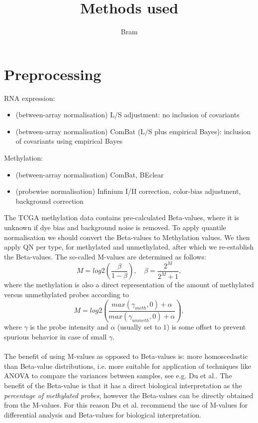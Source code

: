 \documentclass[a4paper,10pt]{article}
\title{Methods used}
\author{Bram}
\begin{document}
\section{Preprocessing}
%




RNA expression:
\begin{itemize}
 \item (between-array normalisation) L/S adjustment: no inclusion of covariants
 \item (between-array normalisation) ComBat (L/S plus empirical Bayes): inclusion of covariants using empirical Bayes
\end{itemize}
%
Methylation:
\begin{itemize}
 \item (between-array normalisation) ComBat, BEclear
 \item (probewise normalisation) Infinium I/II correction, color-bias adjustment, background correction
\end{itemize}
%

The TCGA methylation data contains pre-calculated Beta-values, where it is unknown if dye bias and background noise is removed.
To apply quantile normalisation we should convert the Beta-values to Methylation values. We then apply QN per type, for methylated and unmethylated, after which we re-establish the Beta-values.
%
The so-called M-values are determined as follows:
\begin{equation}
 M  = log2\left({\frac{\beta}{1-\beta}}\right), \quad \beta = \frac{2^M}{2^M+1},
\end{equation}
%
where the methylation is also a direct representation of the amount of methylated versus unmethylated probes according to
\begin{equation}
 M  = log2\left({\frac{max(\gamma_{meth},0)+\alpha}{max(\gamma_{unmeth},0)+\alpha}}\right),
\end{equation}
%
where $\gamma$ is the probe intensity and $\alpha$ (usually set to $1$) is some offset to prevent spurious behavior in case of small $\gamma$. \\ \\
%
The benefit of using M-values as opposed to Beta-values is: 
more homoscedastic than Beta-value distributions, i.e. more suitable for application of techniques like ANOVA to compare the variances between samples, see e.g. Du et al.\cite{Du2010}.
%
The benefit of the Beta-value is that it has a direct biological interpretation as the \textit{percentage of methylated probes}, however the Beta-values can be directly obtained from the M-values. For this reason Du et al.\cite{Du2010} recommend the use of M-values for differential analysis and Beta-values for biological interpretation. 
%
\end{document}
